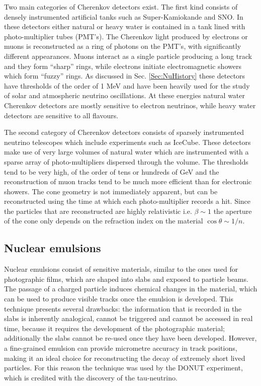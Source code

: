 Two main categories of Cherenkov detectors exist. The first kind consists of densely instrumented artificial tanks such as Super-Kamiokande and SNO. In these detectors either natural or heavy water is contained in a tank lined with photo-multiplier tubes (PMT's). The Cherenkov light produced by electrons or muons is reconstructed as a ring of photons on the PMT's, with significantly different appearances. Muons interact as a single particle producing a long track and they form \enquote{sharp} rings, while electrons initiate electromagnetic showers which form \enquote{fuzzy} rings. As discussed in Sec. \ref{Sec:NuHistory} these detectors have thresholds of the order of 1 MeV and have been heavily used for the study of solar and atmospheric neutrino oscillations. At these energies natural water Cherenkov detectors are mostly sensitive to electron neutrinos, while heavy water detectors are sensitive to all flavours.

The second category of Cherenkov detectors consists of sparsely instrumented neutrino telescopes which include experiments such as IceCube. These detectors make use of very large volumes of natural water which are instrumented with a sparse array of photo-multipliers dispersed through the volume. The thresholds tend to be very high, of the order of tens or hundreds of GeV and the reconstruction of muon tracks tend to be much more efficient than for electronic showers. The cone geometry is not immediately apparent, but can be reconstructed using the time at which each photo-multiplier records a hit. Since the particles that are reconstructed are highly relativistic i.e. $\beta\sim 1$ the aperture of the cone only depends on the refraction index on the material $\cos\theta \sim 1/n$.

\subsection{Nuclear emulsions}
Nuclear emulsions consist of sensitive materials, similar to the ones used for photographic films, which are shaped into slabs and exposed to particle beams. The passage of a charged particle induces chemical changes in the material, which can be used to produce visible tracks once the emulsion is developed. This technique presents several drawbacks: the information that is recorded in the slabs is inherently analogical, cannot be triggered and cannot be accessed in real time, because it requires the development of the photographic material; additionally the slabs cannot be re-used once they have been developed. However, a fine-grained emulsion can provide micrometre accuracy in track positions, making it an ideal choice for reconstructing the decay of extremely short lived particles. For this reason the technique was used  by the DONUT experiment, which is credited with the discovery of the tau-neutrino. 


